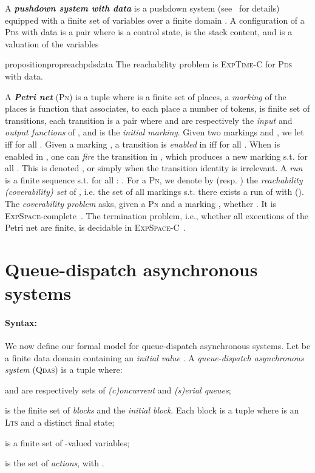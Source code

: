 \documentclass[runningheads,oribibl,]{article}
\newcommand{\lts}{\textsc{Lts}\xspace}
\newcommand{\pds}{\textsc{Pds}\xspace}
\newcommand{\petri}{\textsc{Pn}\xspace}
\newcommand{\qdas}{\textsc{Qdas}\xspace}
\newcommand{\dexpspace}{\textsc{ExpSpace}\xspace}
\newcommand{\dexpspacecomplete}{\textsc{ExpSpace-C}\xspace}
\newcommand{\dexptimecomplete}{\textsc{ExpTime-C}\xspace}
\newenvironment{myitemize}{\begin{list}{\labelitemi}{\setlength{\topsep}{4pt}\setlength{\partopsep}{0pt}
\setlength{\itemsep}{0pt}
\setlength{\itemindent}{0ex}
\setlength{\listparindent}{0ex}
\setlength{\leftmargin}{4ex}\setlength{\labelwidth}{2ex}
}}
{\end{list}}
\begin{document}
\smallskip\noindent A \emph{\bf pushdown system with data} is a
pushdown system (see~\cite{bouajjani-a-1997-135-a} for details)
equipped with a finite set of variables  over a
finite domain . A configuration of a \pds with data is a pair
 where  is a control state,  is the stack content,
and  is a valuation of the variables

\begin{restatable}{proposition}{propreachpdsdata}\label{prop:reach_pds_data}
  The reachability problem is \dexptimecomplete for \pds with data.
\end{restatable}


\smallskip\noindent A \emph{\bf Petri net} (\petri) is a tuple
 where  is a finite set of places, a
\emph{marking} of the places is function  that
associates, to each place  a number  of tokens,  is
finite set of transitions, each transition  is a pair  where
           and  are respectively the \emph{input} and
\emph{output functions} of , and  is the \emph{initial
  marking}. Given two markings  and , we let 
iff  for all . Given a marking , a
transition  is \emph{enabled} in  iff  for all . When  is enabled in , one can
\emph{fire} the transition  in , which produces a new marking
 s.t.  for all . This is denoted
\smash{}, or simply  when the
transition identity is irrelevant.  A \emph{run} is a finite sequence
 s.t. for all : .  For a \petri , we denote by  (resp. )
the \emph{reachability (coverability) set} of , i.e. the set of all
markings  s.t. there exists a run  of  with
 (). The \emph{coverability problem} asks, given a
\petri  and a marking , whether . It is
\dexpspace-complete~\cite{esparza-j-1998-374-a}. The termination
problem, i.e., whether all executions of the Petri net
are finite, is decidable in \dexpspacecomplete~\cite{lipton,rackoff}.






\section{Queue-dispatch asynchronous systems}

\paragraph{\bf Syntax:} We now define our formal model for
queue-dispatch asynchronous systems.
Let  be a finite data domain containing an \emph{initial value}
. A \emph{queue-dispatch asynchronous system} (\qdas)  is
a tuple  where:
\begin{myitemize}
  \item  and  are respectively sets of
    \emph{(c)oncurrent} and \emph{(s)erial queues};
  \item  is the finite set of \emph{blocks} and
     the \emph{initial block}.  Each block
     is a tuple  where  is an \lts and
     a distinct final state;
  \item  is a finite set of -valued variables;
  \item  is the set of \emph{actions}, with
    \linebreak[1] .
\end{myitemize}
\end{document}
